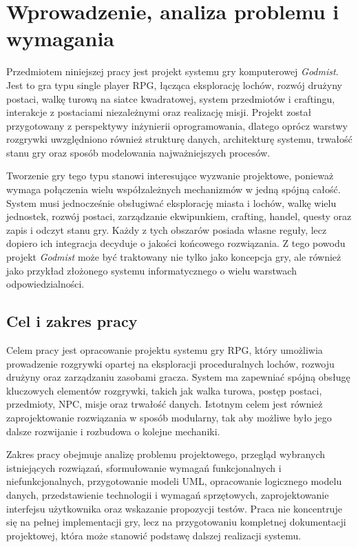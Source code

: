 \chapter{Wprowadzenie, analiza problemu i wymagania}
\label{cha:wprowadzenie-analiza}

Przedmiotem niniejszej pracy jest projekt systemu gry komputerowej \emph{Godmist}. Jest to gra typu single player RPG, łącząca eksplorację lochów, rozwój drużyny postaci, walkę turową na siatce kwadratowej, system przedmiotów i craftingu, interakcje z postaciami niezależnymi oraz realizację misji. Projekt został przygotowany z perspektywy inżynierii oprogramowania, dlatego oprócz warstwy rozgrywki uwzględniono również strukturę danych, architekturę systemu, trwałość stanu gry oraz sposób modelowania najważniejszych procesów.

Tworzenie gry tego typu stanowi interesujące wyzwanie projektowe, ponieważ wymaga połączenia wielu współzależnych mechanizmów w jedną spójną całość. System musi jednocześnie obsługiwać eksplorację miasta i lochów, walkę wielu jednostek, rozwój postaci, zarządzanie ekwipunkiem, crafting, handel, questy oraz zapis i odczyt stanu gry. Każdy z tych obszarów posiada własne reguły, lecz dopiero ich integracja decyduje o jakości końcowego rozwiązania. Z tego powodu projekt \emph{Godmist} może być traktowany nie tylko jako koncepcja gry, ale również jako przykład złożonego systemu informatycznego o wielu warstwach odpowiedzialności.

\section{Cel i zakres pracy}
\label{sec:cel-i-zakres}

Celem pracy jest opracowanie projektu systemu gry RPG, który umożliwia prowadzenie rozgrywki opartej na eksploracji proceduralnych lochów, rozwoju drużyny oraz zarządzaniu zasobami gracza. System ma zapewniać spójną obsługę kluczowych elementów rozgrywki, takich jak walka turowa, postęp postaci, przedmioty, NPC, misje oraz trwałość danych. Istotnym celem jest również zaprojektowanie rozwiązania w sposób modularny, tak aby możliwe było jego dalsze rozwijanie i rozbudowa o kolejne mechaniki.

Zakres pracy obejmuje analizę problemu projektowego, przegląd wybranych istniejących rozwiązań, sformułowanie wymagań funkcjonalnych i niefunkcjonalnych, przygotowanie modeli UML, opracowanie logicznego modelu danych, przedstawienie technologii i wymagań sprzętowych, zaprojektowanie interfejsu użytkownika oraz wskazanie propozycji testów. Praca nie koncentruje się na pełnej implementacji gry, lecz na przygotowaniu kompletnej dokumentacji projektowej, która może stanowić podstawę dalszej realizacji systemu.

